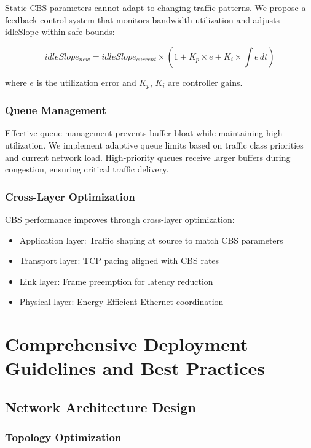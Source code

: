 \documentclass[10pt, journal, compsoc]{IEEEtran}
\begin{document}
Static CBS parameters cannot adapt to changing traffic patterns. We propose a feedback control system that monitors bandwidth utilization and adjusts idleSlope within safe bounds:

\begin{equation}
idleSlope_{new} = idleSlope_{current} \times \left(1 + K_p \times e + K_i \times \int e \, dt\right)
\end{equation}

where $e$ is the utilization error and $K_p$, $K_i$ are controller gains.

\subsubsection{Queue Management}

Effective queue management prevents buffer bloat while maintaining high utilization. We implement adaptive queue limits based on traffic class priorities and current network load. High-priority queues receive larger buffers during congestion, ensuring critical traffic delivery.

\subsubsection{Cross-Layer Optimization}

CBS performance improves through cross-layer optimization:
\begin{itemize}
    \item Application layer: Traffic shaping at source to match CBS parameters
    \item Transport layer: TCP pacing aligned with CBS rates
    \item Link layer: Frame preemption for latency reduction
    \item Physical layer: Energy-Efficient Ethernet coordination
\end{itemize}

\section{Comprehensive Deployment Guidelines and Best Practices}
\label{sec:deployment_guidelines}

\subsection{Network Architecture Design}

\subsubsection{Topology Optimization}
\end{document}
